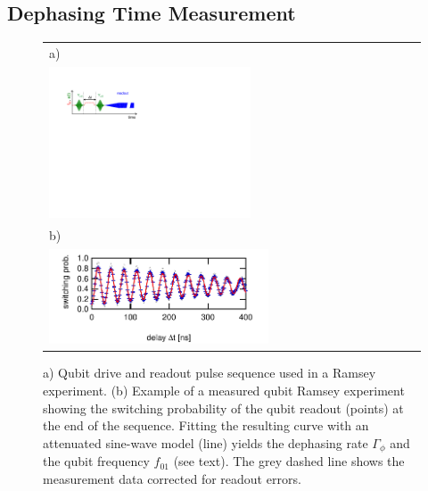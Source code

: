 \subsection{Dephasing Time Measurement}

\begin{figure}
\begin{tabular}{l}
a) \\ \includegraphics[width=0.55\textwidth]{"./material/figures/measurement/qubit_ramsey_oscillation"} \\
b) \\ \includegraphics[width=0.6\textwidth]{"./data/ct5/2011_04_21 - grover and tomo/example - qubit 2 ramsey"} \\
\end{tabular}
\caption[]{a) Qubit drive and readout pulse sequence used in a Ramsey experiment. (b) Example of a measured qubit Ramsey experiment showing the switching probability of the qubit readout (points) at the end of the sequence. Fitting the resulting curve with an attenuated sine-wave model (line) yields the dephasing rate $\Gamma_{\phi}$ and the qubit frequency $f_{01}$ (see text). The grey dashed line shows the measurement data corrected for readout errors.}
\label{fig:qubit_ramsey_example}
\end{figure}

